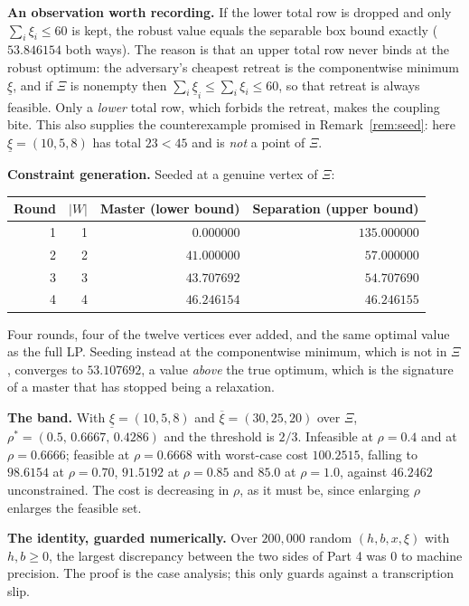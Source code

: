 \documentclass[11pt]{article}
\theoremstyle{definition}
\begin{document}
\textbf{An observation worth recording.} If the lower total row is dropped
and only $\sum_i \xi_i \le 60$ is kept, the robust value equals the
separable box bound exactly ($53.846154$ both ways). The reason is that an
upper total row never binds at the robust optimum: the adversary's
cheapest retreat is the componentwise minimum $\underline{\xi}$, and if
$\Xi$ is nonempty then $\sum_i \underline{\xi}_i \le \sum_i \xi_i \le 60$,
so that retreat is always feasible. Only a \emph{lower} total row, which
forbids the retreat, makes the coupling bite. This also supplies the
counterexample promised in Remark~\ref{rem:seed}: here
$\underline{\xi} = (10,5,8)$ has total $23 < 45$ and is \emph{not} a point
of $\Xi$.

\textbf{Constraint generation.} Seeded at a genuine vertex of $\Xi$:

\begin{center}
\begin{tabular}{@{}rrrr@{}}
\toprule
Round & $|W|$ & Master (lower bound) & Separation (upper bound) \\
\midrule
1 & 1 & $0.000000$  & $135.000000$ \\
2 & 2 & $41.000000$ & $57.000000$ \\
3 & 3 & $43.707692$ & $54.707690$ \\
4 & 4 & $46.246154$ & $46.246155$ \\
\bottomrule
\end{tabular}
\end{center}

Four rounds, four of the twelve vertices ever added, and the same optimal
value as the full LP. Seeding instead at the componentwise minimum, which
is not in $\Xi$, converges to $53.107692$, a value \emph{above} the true
optimum, which is the signature of a master that has stopped being a
relaxation.

\textbf{The band.} With $\underline\xi = (10,5,8)$ and
$\overline\xi = (30,25,20)$ over $\Xi$, $\rho^{*} = (0.5,\,0.6667,\,
0.4286)$ and the threshold is $2/3$. Infeasible at $\rho = 0.4$ and at
$\rho = 0.6666$; feasible at $\rho = 0.6668$ with worst-case cost
$100.2515$, falling to $98.6154$ at $\rho = 0.70$, $91.5192$ at
$\rho=0.85$ and $85.0$ at $\rho = 1.0$, against $46.2462$ unconstrained.
The cost is decreasing in $\rho$, as it must be, since enlarging $\rho$
enlarges the feasible set.

\textbf{The identity, guarded numerically.} Over $200{,}000$ random
$(h,b,x,\xi)$ with $h,b \ge 0$, the largest discrepancy between the two
sides of Part 4 was $0$ to machine precision. The proof is the
case analysis; this only guards against a transcription slip.
\end{document}
